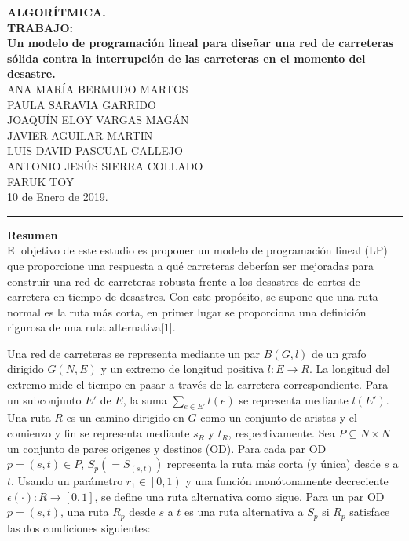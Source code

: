 \documentclass[10pt]{report}
\author{M.Miranda}
\begin{document}
	\sloppy
	

\begin{center}
	\textbf{ALGOR\'ITMICA.}\\
	\textbf{TRABAJO:}\\
	\textbf{Un modelo de programación lineal para diseñar una red de carreteras sólida contra la interrupción de las carreteras en el momento del desastre.}\\	
	\textsc{ANA MARÍA BERMUDO MARTOS}\\
	\textsc{PAULA SARAVIA GARRIDO}\\
	\textsc{JOAQUÍN ELOY VARGAS MAGÁN}\\
	\textsc{JAVIER AGUILAR MARTIN}\\
	\textsc{LUIS DAVID PASCUAL CALLEJO}\\
	\textsc{ANTONIO JES\'US SIERRA COLLADO}\\
    \textsc{FARUK TOY}\\
	10 de Enero de 2019.
	\noindent\rule{15.3cm}{0.4pt}
\end{center}
\textbf{Resumen}\\


El objetivo de este estudio es proponer un modelo de programaci\'on lineal (LP) que proporcione una respuesta a  qu\'e carreteras deber\'ian ser mejoradas para construir una red de carreteras robusta frente a los desastres de cortes de carretera en tiempo de desastres. Con este prop\'osito, se supone que una ruta normal es la ruta más corta, en primer lugar se proporciona una definición rigurosa de una ruta alternativa[1].
 
 Una red de carreteras se representa mediante un par $B\left( G, l\right)$ de un grafo dirigido $G\left( N, E\right)$ y un extremo de longitud positiva $l:E\longrightarrow R$. La longitud del extremo mide  el tiempo en pasar a través de la carretera correspondiente. Para un subconjunto $E'$ de $E$, la suma $\sum_{e\in E '}l\left( e\right)$ se representa mediante $l\left( E' \right)$. Una ruta $R$ es un camino dirigido en $G$ como un conjunto  de aristas y el  comienzo y fin se representa mediante $s_{R}$ y $t_{R}$, respectivamente. Sea $P \subseteq N \times N$ un conjunto de pares origenes y destinos (OD). Para cada par OD $p = \left( s, t\right) \in P$, $S_{p}\left( = S_{\left( s, t\right)}\right)$ representa la ruta más corta (y única) desde $s$ a $t$. Usando un parámetro $r_{1}\in \left[ 0, 1\right)$ y una función monótonamente decreciente $\epsilon \left( \cdot \right): R \longrightarrow \left[ 0,1\right]$, se define una ruta alternativa como sigue. Para un par OD $p=\left( s, t \right)$, una ruta $R_{p}$ desde $s$ a $t$ es una ruta alternativa a $S_{p}$ si $R_{p}$ satisface las dos condiciones siguientes:
\end{document}
